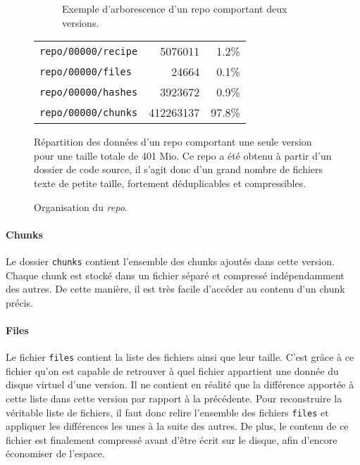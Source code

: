 \documentclass[a4paper]{report}
\begin{document}
\begin{figure*}[ht]
\centering

\begin{subfigure}[c]{.34\textwidth}
  \caption{Exemple d'arborescence d'un repo comportant deux versions.}
  \label{fig:repo-dir-tree}
\end{subfigure}
\hfill
\begin{subtable}[c]{.55\textwidth}
  \centering
  \begin{tabular}{l r r}
  \verb|repo/00000/recipe| &   5076011 &   1.2\% \\
  \verb|repo/00000/files| &      24664 &   0.1\% \\
  \verb|repo/00000/hashes| &   3923672 &   0.9\% \\
  \verb|repo/00000/chunks| & 412263137 &  97.8\% \\
  \end{tabular}
  \caption{
    Répartition des données d'un repo comportant une seule version pour une taille totale de 401 Mio.
    Ce repo a été obtenu à partir d'un dossier de code source,
    il s'agit donc d'un grand nombre de fichiers texte de petite taille, fortement déduplicables et compressibles.
  }
  \label{tab:repo-data-distribution}
\end{subtable}

\caption{Organisation du \emph{repo}.}
\label{fig:repo-organisation}
\end{figure*}

\paragraph{Chunks}
Le dossier \verb|chunks| contient l'ensemble des chunks ajoutés dans cette version.
Chaque chunk est stocké dans un fichier séparé et compressé indépendamment des autres.
De cette manière, il est très facile d'accéder au contenu d'un chunk précis.

\paragraph{Files}
Le fichier \verb|files| contient la liste des fichiers ainsi que leur taille.
C'est grâce à ce fichier qu'on est capable de retrouver
à quel fichier appartient une donnée du disque virtuel d'une version.
Il ne contient en réalité que la différence apportée à cette liste dans cette version
par rapport à la précédente.
Pour reconstruire la véritable liste de fichiers,
il faut donc relire l'ensemble des fichiers \verb|files|
et appliquer les différences les unes à la suite des autres.
De plus, le contenu de ce fichier est finalement compressé avant d'être écrit sur le disque,
afin d'encore économiser de l'espace.
\end{document}

